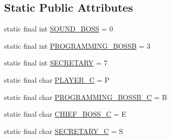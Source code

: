 \subsection*{Static Public Attributes}
\begin{DoxyCompactItemize}
\item 
static final int \mbox{\hyperlink{classgui_1_1_dialogue_g_u_i_ac1839d191cda3ee1ea26661c7c95b696}{S\+O\+U\+N\+D\+\_\+\+B\+O\+SS}} = 0
\item 
static final int \mbox{\hyperlink{classgui_1_1_dialogue_g_u_i_a20c20c2c40856a91944db4e4a3611b45}{P\+R\+O\+G\+R\+A\+M\+M\+I\+N\+G\+\_\+\+B\+O\+S\+SB}} = 3
\item 
static final int \mbox{\hyperlink{classgui_1_1_dialogue_g_u_i_a225108bfd6cb8d667f73afb9c37e7b4f}{S\+E\+C\+R\+E\+T\+A\+RY}} = 7
\item 
static final char \mbox{\hyperlink{classgui_1_1_dialogue_g_u_i_a06b49c7075dba0179bda1c7b738a59b4}{P\+L\+A\+Y\+E\+R\+\_\+C}} = \textquotesingle{}P\textquotesingle{}
\item 
static final char \mbox{\hyperlink{classgui_1_1_dialogue_g_u_i_a628752017405f893e93b1c9e35c7e393}{P\+R\+O\+G\+R\+A\+M\+M\+I\+N\+G\+\_\+\+B\+O\+S\+S\+B\+\_\+C}} = \textquotesingle{}B\textquotesingle{}
\item 
static final char \mbox{\hyperlink{classgui_1_1_dialogue_g_u_i_a890faca007a96dac840c960e2c6ebdc2}{C\+H\+I\+E\+F\+\_\+\+B\+O\+S\+S\+\_\+C}} = \textquotesingle{}E\textquotesingle{}
\item 
static final char \mbox{\hyperlink{classgui_1_1_dialogue_g_u_i_ae859fe49a742bafd01cbaff50a94f654}{S\+E\+C\+R\+E\+T\+A\+R\+Y\+\_\+C}} = \textquotesingle{}S\textquotesingle{}
\end{DoxyCompactItemize}
